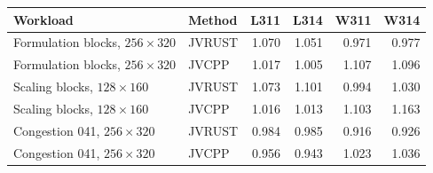 \begin{tabular}{llrrrr}
\toprule
Workload & Method & L311 & L314 & W311 & W314 \\
\midrule
Formulation blocks, $256\times320$ & JVRUST & 1.070 & 1.051 & 0.971 & 0.977 \\
Formulation blocks, $256\times320$ & JVCPP & 1.017 & 1.005 & 1.107 & 1.096 \\
Scaling blocks, $128\times160$ & JVRUST & 1.073 & 1.101 & 0.994 & 1.030 \\
Scaling blocks, $128\times160$ & JVCPP & 1.016 & 1.013 & 1.103 & 1.163 \\
Congestion 041, $256\times320$ & JVRUST & 0.984 & 0.985 & 0.916 & 0.926 \\
Congestion 041, $256\times320$ & JVCPP & 0.956 & 0.943 & 1.023 & 1.036 \\
\bottomrule
\end{tabular}
